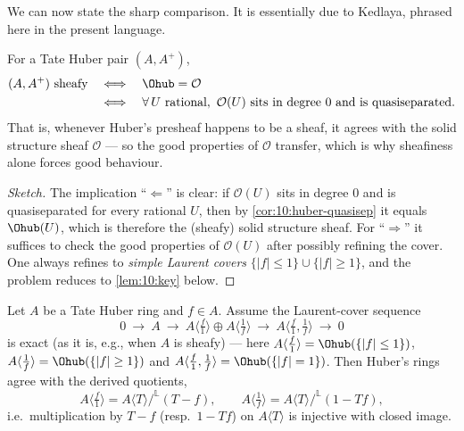 We can now state the sharp comparison. It is essentially due to Kedlaya, phrased
here in the present language.

\begin{theorem}[Sheafy $\Leftrightarrow$ Huber $=$ solid]
\label{thm:10:sheafy-iff}
For a Tate Huber pair $(A,A^{+})$,
\begin{equation*}
\begin{aligned}
(A,A^{+})\ \text{sheafy}&\quad\Longleftrightarrow\quad \Ohub=\mathcal O\\
&\quad\Longleftrightarrow\quad
\forall\,U\ \text{rational},\ \mathcal O(U)\ \text{sits in degree }0
\ \text{and is quasiseparated}.
\end{aligned}
\end{equation*}
That is, whenever Huber's presheaf happens to be a sheaf, it agrees with the solid
structure sheaf $\mathcal O$ --- so the good properties of $\mathcal O$ transfer,
which is why sheafiness alone forces good behaviour.
\end{theorem}

\begin{proof}[Sketch]
The implication ``$\Leftarrow$'' is clear: if $\mathcal O(U)$ sits in degree $0$
and is quasiseparated for every rational $U$, then by
\cref{cor:10:huber-quasisep} it equals $\Ohub(U)$, which is therefore the (sheafy)
solid structure sheaf. For ``$\Rightarrow$'' it suffices to check the good
properties of $\mathcal O(U)$ after possibly refining the cover. One always
refines to \emph{simple Laurent covers} $\{|f|\le1\}\cup\{|f|\ge1\}$, and the
problem reduces to \cref{lem:10:key} below.
\end{proof}

\begin{lemma}
\label{lem:10:key}
Let $A$ be a Tate Huber ring and $f\in A$. Assume the Laurent-cover sequence
\begin{equation}
\label{eq:10:laurent-sequence}
0\ \to\ A\ \to\ A\langle \tfrac f1\rangle\oplus A\langle\tfrac1f\rangle\ \to\
A\langle \tfrac f1,\tfrac1f\rangle\ \to\ 0
\end{equation}
is exact (as it is, e.g., when $A$ is sheafy) --- here
$A\langle\tfrac f1\rangle=\Ohub(\{|f|\le1\})$,
$A\langle\tfrac1f\rangle=\Ohub(\{|f|\ge1\})$ and
$A\langle\tfrac f1,\tfrac1f\rangle=\Ohub(\{|f|=1\})$. Then Huber's rings agree
with the derived quotients,
\begin{equation*}
A\langle \tfrac f1\rangle=A\langle T\rangle/^{\mathbb{L}}(T-f),\qquad
A\langle \tfrac1f\rangle=A\langle T\rangle/^{\mathbb{L}}(1-Tf),
\end{equation*}
i.e.\ multiplication by $T-f$ (resp.\ $1-Tf$) on $A\langle T\rangle$ is injective
with closed image.
\end{lemma}

